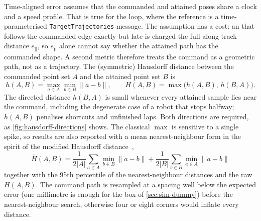 Time-aligned error assumes that the commanded and attained poses share a
clock and a speed profile. That is true for the \ocs{} loop, where the
reference is a time-parameterised \texttt{TargetTrajectories} message.
The assumption has a cost: an \ee{} that follows the commanded edge
exactly but late is charged the full along-track distance
$e_{\parallel}$, so $e_{\mathrm{p}}$ alone cannot say whether the
attained path has the commanded shape. A second metric therefore treats
the command as a geometric path, not as a trajectory. The (symmetric)
Hausdorff distance
between the commanded point set $A$ and the attained point set $B$
is~\cite{Huttenlocher1993Hausdorff}
\begin{equation}
  h(A,B) = \max_{a \in A} \min_{b \in B} \lVert a-b \rVert,
  \qquad
  H(A,B) = \max\bigl(h(A,B),\, h(B,A)\bigr).
  \label{eq:hausdorff}
\end{equation}
The directed distance $h(B,A)$ is small whenever every attained sample
lies near the command, including the degenerate case of a robot that
stops halfway; $h(A,B)$ penalises shortcuts and unfinished laps. Both
directions are required, as \cref{fig:hausdorff-directions} shows. The classical $\max$ is sensitive to a single
spike, so results are also reported with a mean nearest-neighbour form
in the spirit of the modified Hausdorff
distance~\cite{Dubuisson1994ModifiedHausdorff},
\begin{equation}
  \overline{H}(A,B)
    = \frac{1}{2|A|}\sum_{a\in A}\min_{b\in B}\lVert a-b \rVert
    + \frac{1}{2|B|}\sum_{b\in B}\min_{a\in A}\lVert a-b \rVert
  \label{eq:mean-hausdorff}
\end{equation}
together with the 95th percentile of the nearest-neighbour distances and
the raw $H(A,B)$. The command path is resampled at a spacing well below
the expected error (one millimetre is enough for the box of
\cref{sec:sim-dummy}) before the nearest-neighbour search, otherwise
four or eight corners would inflate every distance.

